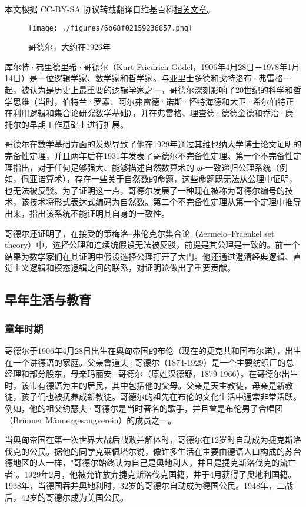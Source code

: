 
本文根据 CC-BY-SA 协议转载翻译自维基百科\href{https://en.wikipedia.org/wiki/Kurt_G\%C3\%B6del}{相关文章}。

\begin{figure}[ht]
\centering
\texttt{[image: ./figures/6b68f02159236857.png]}
\caption{哥德尔，大约在1926年} \label{fig_KRT_1}
\end{figure}
库尔特·弗里德里希·哥德尔（Kurt Friedrich Gödel，1906年4月28日－1978年1月14日）是一位逻辑学家、数学家和哲学家。与亚里士多德和戈特洛布·弗雷格一起，被认为是历史上最重要的逻辑学家之一，哥德尔深刻影响了20世纪的科学和哲学思维（当时，伯特兰·罗素、阿尔弗雷德·诺斯·怀特海德和大卫·希尔伯特正在利用逻辑和集合论研究数学基础），并在弗雷格、理查德·德德金德和乔治·康托尔的早期工作基础上进行扩展。

哥德尔在数学基础方面的发现导致了他在1929年通过其维也纳大学博士论文证明的完备性定理，并且两年后在1931年发表了哥德尔不完备性定理。第一个不完备性定理指出，对于任何足够强大、能够描述自然数算术的 ω-一致递归公理系统（例如，佩亚诺算术），存在一些关于自然数的命题，这些命题既无法从公理中证明，也无法被反驳。为了证明这一点，哥德尔发展了一种现在被称为哥德尔编号的技术，该技术将形式表达式编码为自然数。第二个不完备性定理从第一个定理中推导出来，指出该系统不能证明其自身的一致性。

哥德尔还证明了，在接受的策梅洛–弗伦克尔集合论（Zermelo–Fraenkel set theory）中，选择公理和连续统假设无法被反驳，前提是其公理是一致的。前一个结果为数学家们在其证明中假设选择公理打开了大门。他还通过澄清经典逻辑、直觉主义逻辑和模态逻辑之间的联系，对证明论做出了重要贡献。
\subsection{早年生活与教育}
\subsubsection{童年时期}
哥德尔于1906年4月28日出生在奥匈帝国的布伦（现在的捷克共和国布尔诺），出生在一个讲德语的家庭。父亲鲁道夫·哥德尔（1874-1929）是一个主要纺织厂的总经理和部分股东，母亲玛丽安·哥德尔（原姓汉德舒，1879-1966）。在哥德尔出生时，该市有德语为主的居民，其中包括他的父母。父亲是天主教徒，母亲是新教徒，孩子们也被抚养成新教徒。哥德尔的祖先在布伦的文化生活中通常非常活跃。例如，他的祖父约瑟夫·哥德尔是当时著名的歌手，并且曾是布伦男子合唱团（Brünner Männergesangverein）的成员之一。

当奥匈帝国在第一次世界大战后战败并解体时，哥德尔在12岁时自动成为捷克斯洛伐克的公民。据他的同学克莱佩塔尔说，像许多生活在主要由德语人口构成的苏台德地区的人一样，"哥德尔始终认为自己是奥地利人，并且是捷克斯洛伐克的流亡者"。1929年2月，他被允许放弃捷克斯洛伐克国籍，并于4月获得了奥地利国籍。1938年，当德国吞并奥地利时，32岁的哥德尔自动成为德国公民。1948年，二战后，42岁的哥德尔成为美国公民。

